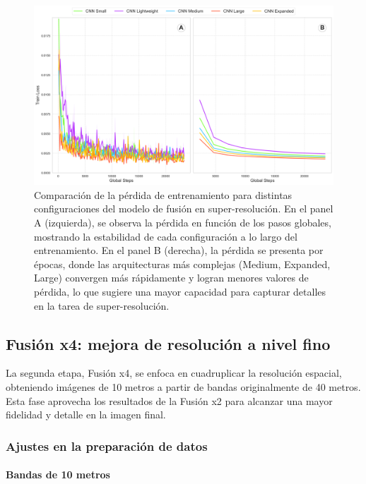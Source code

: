            \begin{figure}[H]
                \centering
                \includegraphics[width=1\linewidth]{images/loss_train_fusionx2.png}
                \caption{Comparación de la pérdida de entrenamiento para distintas configuraciones del modelo de fusión en super-resolución. En el panel A (izquierda), se observa la pérdida en función de los pasos globales, mostrando la estabilidad de cada configuración a lo largo del entrenamiento. En el panel B (derecha), la pérdida se presenta por épocas, donde las arquitecturas más complejas (Medium, Expanded, Large) convergen más rápidamente y logran menores valores de pérdida, lo que sugiere una mayor capacidad para capturar detalles en la tarea de super-resolución.}


                \label{fig:loss_train_fusionx2}
            \end{figure}


    \subsection{Fusión x4: mejora de resolución a nivel fino}

        La segunda etapa, Fusión x4, se enfoca en cuadruplicar la resolución espacial, obteniendo imágenes de 10 metros a partir de bandas originalmente de 40 metros. Esta fase aprovecha los resultados de la Fusión x2 para alcanzar una mayor fidelidad y detalle en la imagen final.

        \subsubsection{Ajustes en la preparación de datos}

            \paragraph{Bandas de 10 metros}

